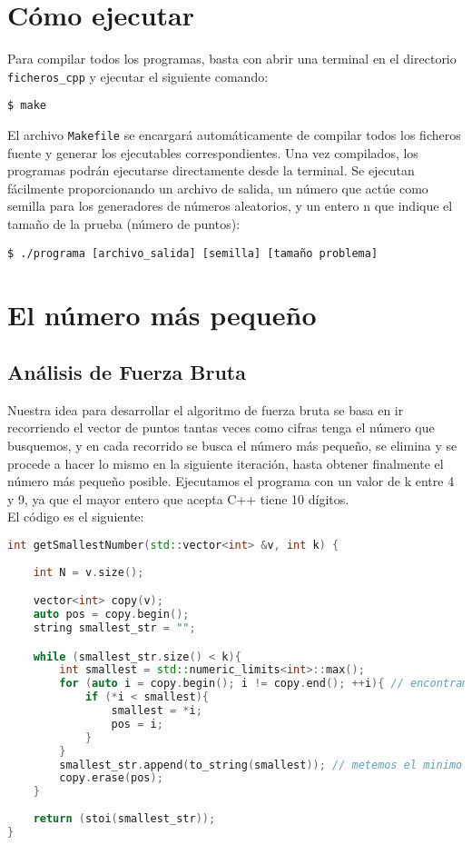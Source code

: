 \documentclass[a4paper,12pt]{article}
\begin{document}
\section{Cómo ejecutar}
Para compilar todos los programas, basta con abrir una terminal en el directorio \texttt{ficheros\_cpp} y ejecutar el siguiente comando:

\begin{center}
\texttt{\$ make}
\end{center}

El archivo \texttt{Makefile} se encargará automáticamente de compilar todos los ficheros fuente y generar los ejecutables correspondientes. Una vez compilados, los programas podrán ejecutarse directamente desde la terminal.
Se ejecutan fácilmente proporcionando un archivo de salida, un número que actúe como semilla para los generadores de números aleatorios, y un entero n que indique el tamaño de la prueba (número de puntos):
\begin{center}
	\verb|$ ./programa [archivo_salida] [semilla] [tamaño problema]|
	\end{center}
	
\section{El número más pequeño}
\label{sec:El número más pequeño}
\subsection{Análisis de Fuerza Bruta}

Nuestra idea para desarrollar el algoritmo de fuerza bruta se basa en ir recorriendo el vector de 
puntos tantas veces como cifras tenga el número que busquemos, y en cada recorrido se busca el 
número más pequeño, se elimina y se procede a hacer lo mismo en la siguiente iteración, hasta obtener 
finalmente el número más pequeño posible. Ejecutamos el programa con un valor de k entre 4 y 9, ya 
que el mayor entero que acepta C++ tiene 10 dígitos.\\

El código es el siguiente:

\begin{lstlisting}[language=C++, caption={Brute Force de \textbf{``El número más pequeño''}}]
int getSmallestNumber(std::vector<int> &v, int k) {
    
    int N = v.size();

    vector<int> copy(v);
    auto pos = copy.begin();
    string smallest_str = "";

    while (smallest_str.size() < k){
        int smallest = std::numeric_limits<int>::max();
        for (auto i = copy.begin(); i != copy.end(); ++i){ // encontramos minimo
            if (*i < smallest){
                smallest = *i;
                pos = i;
            }
        }
        smallest_str.append(to_string(smallest)); // metemos el minimo
        copy.erase(pos);
    }
    
    return (stoi(smallest_str));
}	
	 \end{lstlisting}
\end{document}
